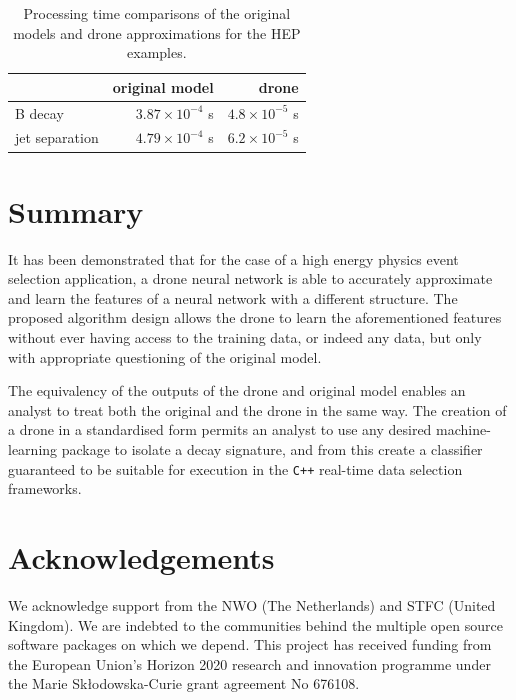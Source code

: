 \documentclass[final,5p,times,twocolumn]{elsarticle}
\begin{document}
\begin{table}[t]
  \centering
  \caption{Processing time comparisons of the original models and drone
  approximations for the HEP examples. \label{tab:comp}}
  \begin{tabular}{l|rr}
                   & original model                  & drone \\
    \hline
    B decay        & $3.87 \times 10^{-4}$ s & $4.8 \times 10^{-5}$ s \\
    jet separation & $4.79 \times 10^{-4}$ s & $6.2 \times 10^{-5}$ s \\
  \end{tabular}
\end{table}


\section{Summary}
\label{sec:summary}

It has been demonstrated that for the case of a high energy physics
event selection application, a drone neural network is able to accurately
approximate and learn the features of a neural network with a different
structure. The proposed algorithm design allows the drone to learn the
aforementioned features without ever having access to the training data,
or indeed any data, but only with appropriate questioning of the original model.

The equivalency of the outputs of the drone and original model enables an
analyst to treat both the original and the drone in the same way. The creation
of a drone in a standardised form permits an analyst to use any desired machine-learning
package to isolate a decay signature, and from this create a classifier
guaranteed to be suitable for execution in the {\tt C++} real-time data selection frameworks.


\section*{Acknowledgements}

\noindent
We acknowledge support from
the NWO (The Netherlands) and STFC (United Kingdom).
We are indebted to the communities behind the multiple open
source software packages on which we depend.
This project has received funding from the European Union’s Horizon
2020 research and innovation programme under the Marie Skłodowska-Curie
grant agreement No 676108.
\end{document}
